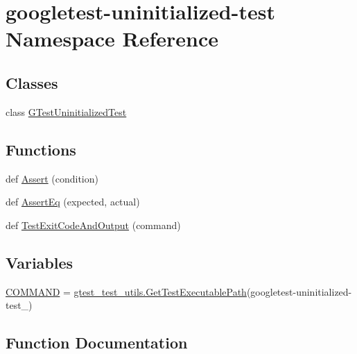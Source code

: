 \hypertarget{namespacegoogletest-uninitialized-test}{}\section{googletest-\/uninitialized-\/test Namespace Reference}
\label{namespacegoogletest-uninitialized-test}
\subsection*{Classes}
\begin{DoxyCompactItemize}
\item 
class \mbox{\hyperlink{classgoogletest-uninitialized-test_1_1_g_test_uninitialized_test}{G\+Test\+Uninitialized\+Test}}
\end{DoxyCompactItemize}
\subsection*{Functions}
\begin{DoxyCompactItemize}
\item 
def \mbox{\hyperlink{namespacegoogletest-uninitialized-test_af02e731714736167bb758ba94b8ec109}{Assert}} (condition)
\item 
def \mbox{\hyperlink{namespacegoogletest-uninitialized-test_a8b48f5e81e60f11030082240561c7f94}{Assert\+Eq}} (expected, actual)
\item 
def \mbox{\hyperlink{namespacegoogletest-uninitialized-test_a70d1a3c3521654597facb5344ee1c968}{Test\+Exit\+Code\+And\+Output}} (command)
\end{DoxyCompactItemize}
\subsection*{Variables}
\begin{DoxyCompactItemize}
\item 
\mbox{\hyperlink{namespacegoogletest-uninitialized-test_a2526f9a60be6da67bfed64cac54d836b}{C\+O\+M\+M\+A\+ND}} = \mbox{\hyperlink{namespacegtest__test__utils_a89ed3717984a80ffbb7a9c92f71b86a2}{gtest\+\_\+test\+\_\+utils.\+Get\+Test\+Executable\+Path}}(\textquotesingle{}googletest-\/uninitialized-\/test\+\_\+\textquotesingle{})
\end{DoxyCompactItemize}


\subsection{Function Documentation}
\mbox{\label{namespacegoogletest-uninitialized-test_af02e731714736167bb758ba94b8ec109}} 
